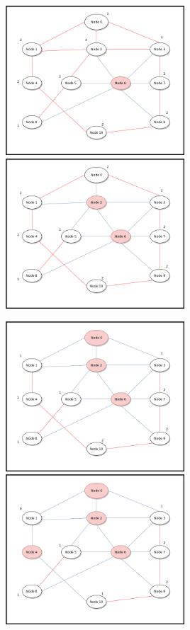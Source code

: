 \documentclass[a4paper, 11pt]{article}
\begin{document}
\includegraphics[width=0.5\textwidth]{gif-2.png}
\includegraphics[width=0.5\textwidth]{gif-3.png}

\includegraphics[width=0.5\textwidth]{gif-4.png}
\includegraphics[width=0.5\textwidth]{gif-5.png}
\end{document}
